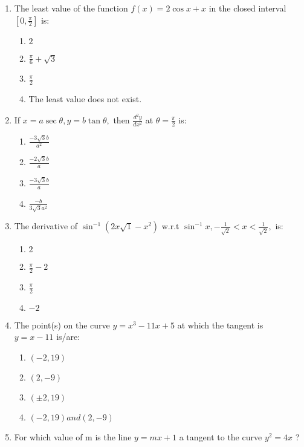 \begin{enumerate}
\item The least value of the function $ f(x) = 2\cos x + x $ in the closed interval $[0, \frac{\pi}{2}]$ is:

  	\begin{enumerate}
      	\item $ 2 $ 
      	\item $ \frac{\pi}{6} + \sqrt 3$
      	\item $ \frac{\pi}{2} $
	      \item  The least value does not exist. 
  	\end{enumerate}

\item If $ x = a\sec \theta, y = b\tan \theta,$ then $ \frac{d^2y}{dx^2} $ at $ \theta = \frac{\pi}{2}$ is:
  
  	\begin{enumerate}
    	\item $ \frac{-3\sqrt 3b}{a^2} $
    	\item $ \frac{-2\sqrt 3b}{a} $
    	\item $ \frac{-3\sqrt 3b}{a} $
    	\item $ \frac{-b}{3 \sqrt 3a^2 }$
  	\end{enumerate}

\item The derivative of $ \sin^{-1} (2x \sqrt 1 - x^2) $ w.r.t $ \sin^{-1} x,  -\frac{1}{\sqrt 2 } < x < \frac{1}{\sqrt 2},$ is:
  
  	\begin{enumerate}
    	\item $ 2 $
    	\item $ \frac{\pi}{2} -2 $
    	\item $ \frac{\pi}{2} $
    	\item $ -2 $
  	\end{enumerate}

\item The point(s) on the curve  $ y = x^3 - 11x + 5 $ at which the tangent is $ y = x - 11 $ is/are:
  
  	\begin{enumerate}
    	\item $ (-2, 19)$
    	\item $ ( 2, -9)$
    	\item $ (\pm 2, 19) $
    	\item $ (-2 , 19) and (2, -9) $
  	\end{enumerate}

\item For which value of m is the line  $ y = mx + 1 $ a tangent to the curve $ y^2 = 4x $ ?
  

\end{enumerate}
